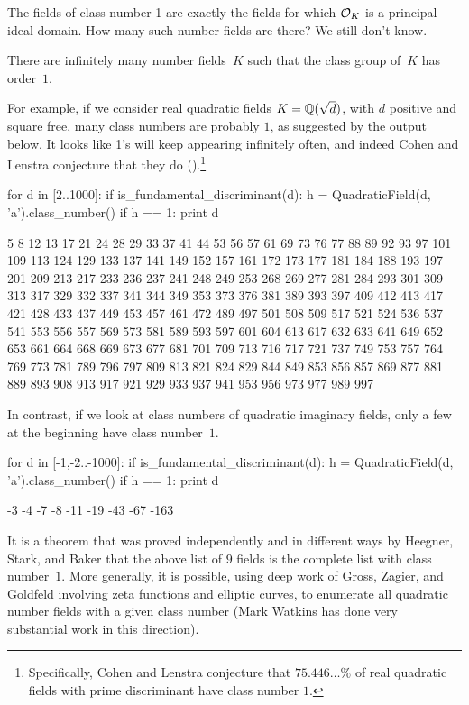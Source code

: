 The fields of class number 1 are exactly the fields for
which $\mathcal{O}_K$ is a principal ideal domain.  How many such
number fields are there?   We still don't know.
\begin{conjecture}
	There are infinitely many number fields~$K$ such that the class
	group of~$K$ has order~$1$.
\end{conjecture}
For example, if we consider real quadratic fields $K=\mathbb{Q}(\sqrt{d})$,
with $d$ positive and square free, many class numbers are probably $1$,
as suggested by the \sage output below.
It looks like 1's will keep appearing infinitely often, and indeed
Cohen and Lenstra conjecture that they do
(\cite{cohen-lenstra:heuristics}).\footnote{Specifically, Cohen and
Lenstra conjecture that $75.446\dots\%$ of real quadratic fields
with prime discriminant have class number $1$.}
\begin{sagecode}
\begin{sagecell}
for d in [2..1000]:
    if is_fundamental_discriminant(d):
        h = QuadraticField(d, 'a').class_number()
        if h == 1:
            print d
\end{sagecell}
\begin{sageout}
5 8 12 13 17 21 24 28 29 33 37 41 44 53 56 57 61 69
73 76 77 88 89 92 93 97 101 109 113 124 129 133 137
141 149 152 157 161 172 173 177 181 184 188 193 197
201 209 213 217 233 236 237 241 248 249 253 268 269
277 281 284 293 301 309 313 317 329 332 337 341 344
349 353 373 376 381 389 393 397 409 412 413 417 421
428 433 437 449 453 457 461 472 489 497 501 508 509
517 521 524 536 537 541 553 556 557 569 573 581 589
593 597 601 604 613 617 632 633 641 649 652 653 661
664 668 669 673 677 681 701 709 713 716 717 721 737
749 753 757 764 769 773 781 789 796 797 809 813 821
824 829 844 849 853 856 857 869 877 881 889 893 908
913 917 921 929 933 937 941 953 956 973 977 989 997
\end{sageout}
\end{sagecode}
In contrast, if we look at class numbers of quadratic imaginary fields,
only a few at the beginning have class number~$1$.
\begin{sagecode}
\begin{sagecell}
for d in [-1,-2..-1000]:
    if is_fundamental_discriminant(d):
        h = QuadraticField(d, 'a').class_number()
        if h == 1:
            print d
\end{sagecell}
\begin{sageout}
-3 -4 -7 -8 -11 -19 -43 -67 -163
\end{sageout}
\end{sagecode}
It is a theorem that was proved independently and in different ways by
Heegner, Stark, and Baker that the above list of $9$ fields is the
complete list with class number~$1$.  More generally, it is possible,
using deep work of Gross, Zagier, and Goldfeld involving zeta
functions and elliptic curves, to enumerate all quadratic number
fields with a given class number (Mark Watkins has done very
substantial work in this direction).

